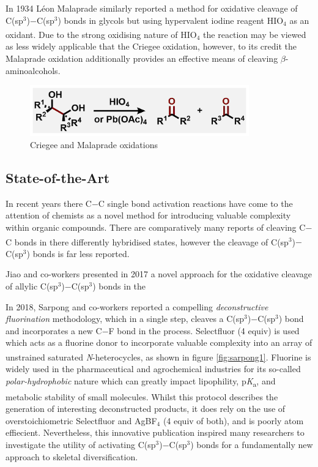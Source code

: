 In 1934 L\'eon Malaprade similarly reported a method for oxidative cleavage of C(sp$^3$)$-$C(sp$^3$) bonds in glycols but using hypervalent iodine reagent HIO$_4$ as an oxidant.\textsuperscript{\cite{malaprade:1934}} Due to the strong oxidising nature of HIO$_4$ the reaction may be viewed as less widely applicable that the Criegee oxidation, however, to its credit the Malaprade oxidation additionally provides an effective means of cleaving $\beta$-aminoalcohols.

\begin{figure}[hbt!]
\centering
\begin{minipage}{\textwidth}
   \centering
   \includegraphics[height=2.2cm]{gfx/malaprade-criegee} %
   \caption{Criegee and Malaprade oxidations}
   \label{fig:malaprade-malaprade}
\end{minipage}\hfill
\end{figure}

\subsection{State-of-the-Art}

\noindent In recent years there C$-$C single bond activation reactions have come to the attention of chemists as a novel method for introducing valuable complexity within organic compounds. There are comparatively many reports of cleaving C$-$C bonds in there differently hybridised states,\textsuperscript{\cite{zhou:2015, qin:2016, liu:2017, liang:2017, zhao:2018, liu:2019, adeli:2019, tsang:2015}} however the cleavage of C(sp$^3$)$-$C(sp$^3$) bonds is far less reported.

Jiao and co-workers presented in 2017 a novel approach for the oxidative cleavage of allylic C(sp$^3$)$-$C(sp$^3$) bonds in the 

In 2018, Sarpong and co-workers reported a compelling \textit{deconstructive fluorination} methodology, which in a single step, cleaves a C(sp$^3$)$-$C(sp$^3$) bond and incorporates a new C$-$F bond in the process. Selectfluor (4 equiv) is used which acts as a fluorine donor to incorporate valuable complexity into an array of unstrained saturated \textit{N}-heterocycles, as shown in figure \ref{fig:sarpong1}.\textsuperscript{\cite{roque:2018}} Fluorine is widely used in the pharmaceutical and agrochemical industries for its so-called \textit{polar-hydrophobic} nature which can greatly impact lipophility, p\textit{K}\textsubscript{a}, and metabolic stability of small molecules.\textsuperscript{\cite{dalvi:2010}} Whilst this protocol describes the generation of interesting deconstructed products, it does rely on the use of overstoichiometric Selectfluor and AgBF$_4$ (4 equiv of both), and is poorly atom effiecient. Nevertheless, this innovative publication inspired many researchers to investigate the utility of activating C(sp$^3$)$-$C(sp$^3$) bonds for a fundamentally new approach to skeletal diversification. 


